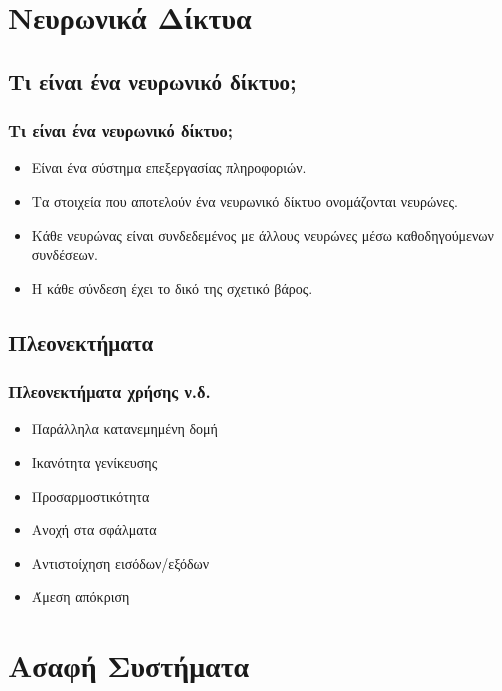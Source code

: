 \documentclass[xetex,serif,mathserif,14pt]{beamer}
\begin{document}
\section{Νευρωνικά Δίκτυα} %

\subsection{Τι είναι ένα νευρωνικό δίκτυο;}

\begin{frame}
\frametitle{Τι είναι ένα νευρωνικό δίκτυο;}
\begin{itemize}
  \item Είναι ένα σύστημα επεξεργασίας πληροφοριών.\pause
  \item Τα στοιχεία που αποτελούν ένα νευρωνικό δίκτυο ονομάζονται νευρώνες.\pause
  \item Κάθε νευρώνας είναι συνδεδεμένος με άλλους νευρώνες μέσω  καθοδηγούμενων  συνδέσεων.\pause
  \item  Η κάθε σύνδεση έχει το δικό της σχετικό βάρος.
\end{itemize}
\end{frame}


\subsection{Πλεονεκτήματα}

\begin{frame}
\frametitle{Πλεονεκτήματα χρήσης ν.δ.}
\begin{itemize}
  \item Παράλληλα κατανεμημένη δομή\pause
  \item Ικανότητα γενίκευσης\pause
  \item Προσαρμοστικότητα\pause
  \item Ανοχή στα σφάλματα\pause
  \item Αντιστοίχηση εισόδων/εξόδων\pause
  \item Άμεση απόκριση
\end{itemize}
\end{frame}


\section{Ασαφή Συστήματα}
\end{document}
